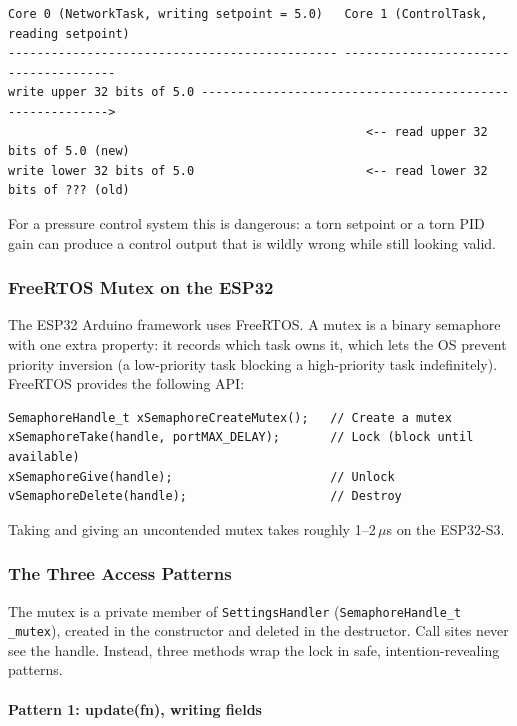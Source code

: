 \begin{verbatim}
Core 0 (NetworkTask, writing setpoint = 5.0)   Core 1 (ControlTask, reading setpoint)
---------------------------------------------- --------------------------------------
write upper 32 bits of 5.0 --------------------------------------------------------->
                                                  <-- read upper 32 bits of 5.0 (new)
write lower 32 bits of 5.0                        <-- read lower 32 bits of ??? (old)
\end{verbatim}

For a pressure control system this is dangerous: a torn setpoint or a torn PID gain can
produce a control output that is wildly wrong while still looking valid.

\subsubsection{FreeRTOS Mutex on the ESP32}

The ESP32 Arduino framework uses FreeRTOS. A mutex is a binary semaphore with one extra
property: it records which task owns it, which lets the OS prevent priority inversion
(a low-priority task blocking a high-priority task indefinitely). FreeRTOS provides the
following API:

\begin{lstlisting}[caption=FreeRTOS Mutex API]
SemaphoreHandle_t xSemaphoreCreateMutex();   // Create a mutex
xSemaphoreTake(handle, portMAX_DELAY);       // Lock (block until available)
xSemaphoreGive(handle);                      // Unlock
vSemaphoreDelete(handle);                    // Destroy
\end{lstlisting}

Taking and giving an uncontended mutex takes roughly 1--2\,$\mu$s on the ESP32-S3.

\subsubsection{The Three Access Patterns}

The mutex is a private member of \texttt{SettingsHandler}
(\texttt{SemaphoreHandle\_t \_mutex}), created in the constructor and deleted in the
destructor. Call sites never see the handle. Instead, three methods wrap the lock in
safe, intention-revealing patterns.

\paragraph{Pattern 1: update(fn), writing fields}

